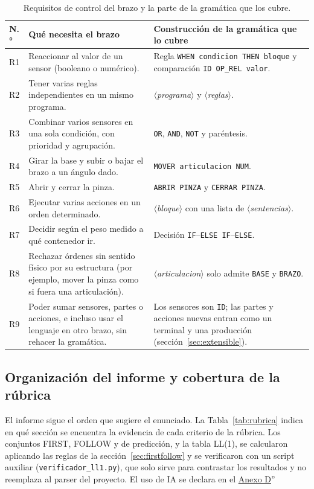 \documentclass[10pt,a4paper]{article}
\newcommand{\nt}[1]{\ensuremath{\langle}\textit{#1}\ensuremath{\rangle}}   %
\newcommand{\tm}[1]{\texttt{#1}}                                          %
\begin{document}
\begin{table}[H]
\centering\small
\begin{tabularx}{\linewidth}{|C{0.9cm}|X|X|}
\hline
\textbf{N.°} & \textbf{Qué necesita el brazo} & \textbf{Construcción de la gramática que lo cubre} \\
\hline
R1 & Reaccionar al valor de un sensor (booleano o numérico). & Regla \tm{WHEN condicion THEN bloque} y comparación \tm{ID OP\_REL valor}. \\
\hline
R2 & Tener varias reglas independientes en un mismo programa. & \nt{programa} y \nt{reglas}. \\
\hline
R3 & Combinar varios sensores en una sola condición, con prioridad y agrupación. & \tm{OR}, \tm{AND}, \tm{NOT} y paréntesis. \\
\hline
R4 & Girar la base y subir o bajar el brazo a un ángulo dado. & \tm{MOVER articulacion NUM}. \\
\hline
R5 & Abrir y cerrar la pinza. & \tm{ABRIR PINZA} y \tm{CERRAR PINZA}. \\
\hline
R6 & Ejecutar varias acciones en un orden determinado. & \nt{bloque} con una lista de \nt{sentencias}. \\
\hline
R7 & Decidir según el peso medido a qué contenedor ir. & Decisión \tm{IF}--\tm{ELSE IF}--\tm{ELSE}. \\
\hline
R8 & Rechazar órdenes sin sentido físico por su estructura (por ejemplo, mover la pinza como si fuera una articulación). & \nt{articulacion} solo admite \tm{BASE} y \tm{BRAZO}. \\
\hline
R9 & Poder sumar sensores, partes o acciones, e incluso usar el lenguaje en otro brazo, sin rehacer la gramática. & Los sensores son \tm{ID}; las partes y acciones nuevas entran como un terminal y una producción (sección~\ref{sec:extensible}). \\
\hline
\end{tabularx}
\caption{Requisitos de control del brazo y la parte de la gramática que los cubre.}
\label{tab:requisitos_brazo}
\end{table}

\subsection{Organización del informe y cobertura de la rúbrica}

El informe sigue el orden que sugiere el enunciado. La Tabla~\ref{tab:rubrica} indica en qué
sección se encuentra la evidencia de cada criterio de la rúbrica. Los conjuntos FIRST, FOLLOW y de predicción, y la tabla LL(1), se calcularon aplicando las reglas
de la sección~\ref{sec:firstfollow} y se verificaron con un script auxiliar
(\tm{verificador\_ll1.py}), que solo sirve para contrastar los resultados y no reemplaza al parser del proyecto. El uso de IA se declara en el \hyperlink{anexoD}{Anexo D}”
\end{document}

